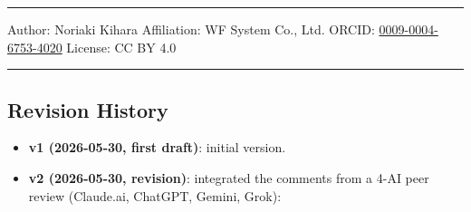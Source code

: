 \documentclass[
]{ltjsarticle}
\providecommand{\tightlist}{%
  \setlength{\itemsep}{0pt}\setlength{\parskip}{0pt}}
\begin{document}
\begin{center}\rule{0.5\linewidth}{0.5pt}\end{center}

Author: Noriaki Kihara Affiliation: WF System Co., Ltd. ORCID:
\href{https://orcid.org/0009-0004-6753-4020}{0009-0004-6753-4020}
License: CC BY 4.0

\begin{center}\rule{0.5\linewidth}{0.5pt}\end{center}

\subsection{Revision History}\label{revision-history}

\begin{itemize}
\tightlist
\item
  \textbf{v1 (2026-05-30, first draft)}: initial version.
\item
  \textbf{v2 (2026-05-30, revision)}: integrated the comments from a
  4-AI peer review (Claude.ai, ChatGPT, Gemini, Grok):


\end{itemize}
\end{document}
